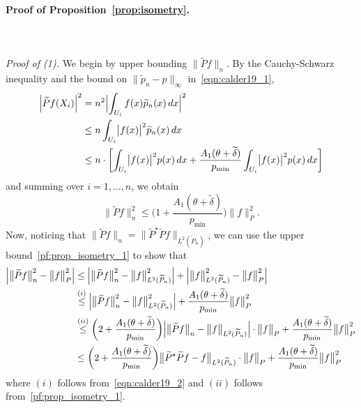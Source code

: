 \documentclass[twoside]{article}
\newcommand{\1}{\mathbf{1}}
\newcommand{\Leb}{L}
\newcommand{\wt}[1]{\widetilde{#1}}
\theoremstyle{definition}
\theoremstyle{remark}
\begin{document}
\paragraph{Proof of Proposition~\ref{prop:isometry}.}
\mbox{}\\
\mbox{}\\
\textit{Proof of (1).}
We begin by upper bounding $\bigl\|\wt{P}f\bigr\|_{n}$. By the Cauchy-Schwarz inequality and the bound on $\|\wt{p}_n - p\|_{\infty}$ in~\eqref{eqn:calder19_1},
\begin{align*}
\Bigl|\wt{P}f(X_i)\Bigr|^2 & = n^2 \Bigl|\int_{U_i} f(x) \wt{p}_n(x) \,dx\Bigr|^2 \\
& \leq n \int_{U_i} \bigl|f(x)\bigr|^2 \wt{p}_n(x) \,dx \\
& \leq n \cdot \biggl[\int_{U_i} \bigl|f(x)\bigr|^2 p(x) \,dx + \frac{A_1(\theta + \wt{\delta})}{p_{\min}} \int_{U_i} \bigl|f(x)\bigr|^2 p(x) \,dx\biggr]
\end{align*}
and summing over $i = 1,\ldots,n$, we obtain
\begin{equation}
\label{pf:prop_isometry_1}
\bigl\|\wt{P}f\bigr\|_{n}^2 \leq \biggl(1 + \frac{A_1(\theta + \wt{\delta})}{p_{\min}}\biggr) \bigl\|f\bigr\|_{P}^2.
\end{equation}
Now, noticing that $\bigl\|\wt{P}f\bigr\|_{n} = \bigl\|\wt{P}^{\star}\wt{P}f\bigr\|_{\Leb^2(\wt{P}_n)}$, we can use the upper bound~\eqref{pf:prop_isometry_1} to show that
\begin{align}
\Bigl|\bigl\|\wt{P}f\bigr\|_{n}^2 - \bigl\|f\bigr\|_{P}^2\Bigr| & \leq \Bigl|\bigl\|\wt{P}f\bigr\|_{n}^2 - \bigl\|f\bigr\|_{\Leb^2(\wt{P}_n)}^2\Bigr| + \Bigl|\bigl\|f\bigr\|_{\Leb^2(\wt{P}_n)}^2 - \bigl\|f\bigr\|_{P}^2\Bigr| \nonumber \\
& \overset{(i)}{\leq} \Bigl|\bigl\|\wt{P}f\bigr\|_{n}^2 - \bigl\|f\bigr\|_{\Leb^2(\wt{P}_n)}^2\Bigr|  + \frac{A_1(\theta + \wt{\delta})}{p_{\min}} \bigl\|f\bigr\|_{P}^2 \\
& \overset{(ii)}{\leq} \biggl(2 + \frac{A_1(\theta + \wt{\delta})}{p_{\min}}\biggr) \Bigl|\bigl\|\wt{P}f\bigr\|_{n} - \bigl\|f\bigr\|_{\Leb^2(\wt{P}_n)}\Bigr| \cdot \bigl\|f\bigr\|_{P} + \frac{A_1(\theta + \wt{\delta})}{p_{\min}} \bigl\|f\bigr\|_{P}^2 \nonumber \\
& \leq \biggl(2 + \frac{A_1(\theta + \wt{\delta})}{p_{\min}}\biggr) \bigl\|\wt{P}^{\star}\wt{P}f - f\bigr\|_{\Leb^2(\wt{P}_n)} \cdot \bigl\|f\bigr\|_{P} + \frac{A_1(\theta + \wt{\delta})}{p_{\min}} \bigl\|f\bigr\|_{P}^2 \label{pf:prop_isometry_2}
\end{align}
where $(i)$ follows from~\eqref{eqn:calder19_2} and $(ii)$ follows from~\eqref{pf:prop_isometry_1}. 
\end{document}
